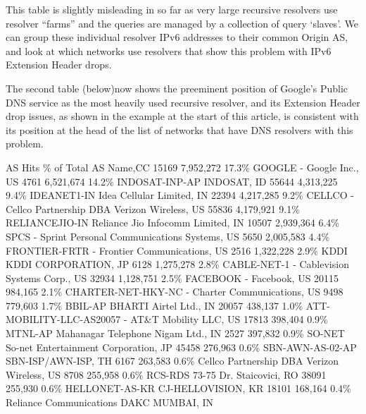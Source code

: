 This table is slightly misleading in so far as very large recursive resolvers use resolver “farms” and the queries are managed by a collection of query ‘slaves’. We can group these individual resolver IPv6 addresses to their common Origin AS, and look at which networks use resolvers that show this problem with IPv6 Extension Header drops.

The second table (below)now shows the preeminent position of Google’s Public DNS service as the most heavily used recursive resolver, and its Extension Header drop issues, as shown in the example at the start of this article, is consistent with its position at the head of the list of networks that have DNS resolvers with this problem.

AS Hits  \% of Total  AS Name,CC
15169    7,952,272   17.3\% GOOGLE - Google Inc., US
4761  6,521,674   14.2\% INDOSAT-INP-AP INDOSAT, ID
55644 4,313,225   9.4\%  IDEANET1-IN Idea Cellular Limited, IN
22394 4,217,285   9.2\%  CELLCO - Cellco Partnership DBA Verizon Wireless, US
55836 4,179,921   9.1\%  RELIANCEJIO-IN Reliance Jio Infocomm Limited, IN
10507 2,939,364   6.4\%  SPCS - Sprint Personal Communications Systems, US
5650  2,005,583   4.4\%  FRONTIER-FRTR - Frontier Communications, US
2516  1,322,228   2.9\%  KDDI KDDI CORPORATION, JP
6128  1,275,278   2.8\%  CABLE-NET-1 - Cablevision Systems Corp., US
32934 1,128,751   2.5\%  FACEBOOK - Facebook, US
20115 984,165  2.1\%  CHARTER-NET-HKY-NC - Charter Communications, US
9498  779,603  1.7\%  BBIL-AP BHARTI Airtel Ltd., IN
20057 438,137  1.0\%  ATT-MOBILITY-LLC-AS20057 - AT&T Mobility LLC, US
17813 398,404  0.9\%  MTNL-AP Mahanagar Telephone Nigam Ltd., IN
2527  397,832  0.9\%  SO-NET So-net Entertainment Corporation, JP
45458 276,963  0.6\%  SBN-AWN-AS-02-AP SBN-ISP/AWN-ISP, TH
6167  263,583  0.6\%  Cellco Partnership DBA Verizon Wireless, US
8708  255,958  0.6\%  RCS-RDS 73-75 Dr. Staicovici, RO
38091 255,930  0.6\%  HELLONET-AS-KR CJ-HELLOVISION, KR
18101 168,164  0.4\%  Reliance Communications DAKC MUMBAI, IN






